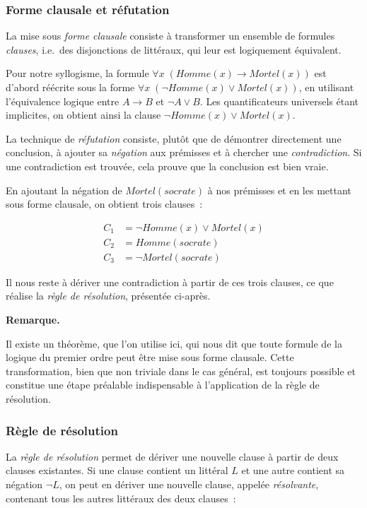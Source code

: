\documentclass[11pt]{article}
\newenvironment{remarque}{%
    \begin{mdframed}[
        linecolor=sectioncolor!40,
        linewidth=0.8pt,
        backgroundcolor=sectioncolor!5,
        innerleftmargin=10pt,
        innerrightmargin=10pt,
        innertopmargin=6pt,
        innerbottommargin=6pt,
        skipabove=8pt,
        skipbelow=8pt
    ]
    \noindent\textbf{\small\color{sectioncolor}Remarque.}\enspace\small\itshape
}{%
    \end{mdframed}
}
\begin{document}
\subsubsection{Forme clausale et réfutation}
La mise sous \textit{forme clausale} consiste à transformer un ensemble de formules
\textit{clauses}, i.e.~des disjonctions de littéraux, qui leur est logiquement équivalent. 

\vspace{0.2cm}
Pour notre syllogisme, la formule 
$\forall x\; (\mathit{Homme}(x) \rightarrow \mathit{Mortel}(x))$ 
est d’abord réécrite sous la forme 
$\forall x\; (\neg \mathit{Homme}(x) \vee \mathit{Mortel}(x))$, 
en utilisant l’équivalence logique entre 
$A \rightarrow B$ et $\neg A \vee B$. 
Les quantificateurs universels étant implicites, on obtient ainsi la clause 
$\neg \mathit{Homme}(x) \vee \mathit{Mortel}(x)$.

\vspace{0.2cm}
La technique de \textit{réfutation} consiste, plutôt que de démontrer 
directement une conclusion, à ajouter sa \textit{négation} aux prémisses 
et à chercher une \textit{contradiction}. Si une contradiction est trouvée, 
cela prouve que la conclusion est bien vraie.

\vspace{0.2cm}
En ajoutant la négation de $\mathit{Mortel}(\mathit{socrate})$ à nos 
prémisses et en les mettant sous forme clausale, on obtient trois clauses~:

\begin{align*}
    C_1 &= \neg\mathit{Homme}(x) \vee \mathit{Mortel}(x) \\
    C_2 &= \mathit{Homme}(\mathit{socrate}) \\
    C_3 &= \neg\mathit{Mortel}(\mathit{socrate})
\end{align*}

Il nous reste à dériver une contradiction à partir de ces trois clauses, 
ce que réalise la \textit{règle de résolution}, présentée ci-après.

\begin{remarque}
    Il existe un théorème, que l'on utilise ici, qui nous dit que toute formule de la logique du premier ordre peut être mise sous forme clausale. Cette transformation, bien que non triviale dans le cas général, est toujours possible et constitue une étape préalable indispensable à l'application de la règle de résolution.
\end{remarque}

\subsubsection{Règle de résolution}
La \textit{règle de résolution} permet de dériver une nouvelle clause 
à partir de deux clauses existantes. Si une clause contient un littéral 
$L$ et une autre contient sa négation $\neg L$, on peut en dériver une 
nouvelle clause, appelée \textit{résolvante}, contenant tous les autres 
littéraux des deux clauses~:
\end{document}
